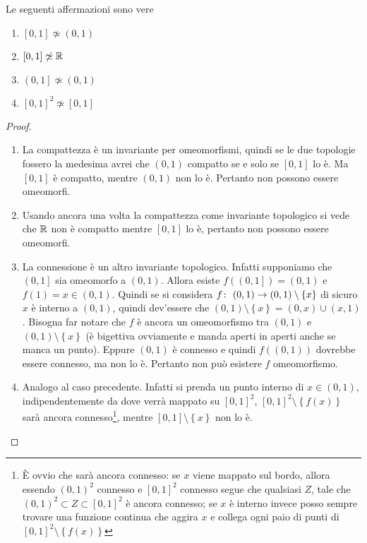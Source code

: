 \begin{theorem}
	Le seguenti affermazioni sono vere
	\begin{enumerate}
		\item $\left[0,1\right] \not\simeq (0,1)$
		\item $\left[0,1\right] \not\simeq \mathbb{R}$
		\item $\left(0,1\right] \not\simeq (0,1)$
		\item $\left[0,1\right]^2 \not\simeq \left[0,1\right]$
	\end{enumerate}
\end{theorem}
\begin{proof}
	\begin{enumerate}
		\item La compattezza è un invariante per omeomorfismi, quindi se le due topologie fossero la medesima avrei che $(0,1)$ compatto se e solo se $\left[0,1\right]$ lo è. Ma $\left[0,1\right]$ è compatto, mentre $(0,1)$ non lo è. Pertanto non possono essere omeomorfi.
		\item Usando ancora una volta la compattezza come invariante topologico si vede che $\mathbb{R}$ non è compatto mentre $\left[0,1\right]$ lo è, pertanto non possono essere omeomorfi.
		\item La connessione è un altro invariante topologico. Infatti supponiamo che $\left(0,1\right]$ sia omeomorfo a $\left(0,1\right)$. Allora esiste $f(\left(0,1\right]) = \left(0,1\right)$ e $f(1) = x \in (0,1)$. Quindi se si considera $f \colon\ (0,1) \rightarrow (0,1)\setminus \left\{x\right\}$ di sicuro $x$ è interno a $(0,1)$, quindi dev'essere che $(0,1) \setminus \left\{x\right\} = (0, x) \cup (x, 1)$. Bisogna far notare che $f$ è ancora un omeomorfismo tra $(0,1)$ e $(0,1)\setminus \left\{x\right\}$ (è bigettiva ovviamente e manda aperti in aperti anche se manca un punto). Eppure $(0,1)$ è connesso e quindi $f((0,1))$ dovrebbe essere connesso, ma non lo è. Pertanto non può esistere $f$ omeomorfismo.
		\item Analogo al caso precedente. Infatti si prenda un punto interno di $x \in (0,1)$, indipendentemente da dove verrà mappato su $\left[0,1\right]^2$, $\left[0,1\right]^2 \setminus \left\{f(x)\right\}$ sarà ancora connesso\footnote{È ovvio che sarà ancora connesso: se $x$ viene mappato sul bordo, allora essendo $(0,1)^2$ connesso e $\left[0,1\right]^2$ connesso segue che qualsiasi $Z$, tale che $(0,1)^2 \subset Z \subset \left[0,1\right]^2$ è ancora connesso; se $x$ è interno invece posso sempre trovare una funzione continua che aggira $x$ e collega ogni paio di punti di $\left[0,1\right]^2 \setminus \left\{f(x)\right\}$}, mentre $\left[0,1\right] \setminus \left\{x\right\}$ non lo è. 
	\end{enumerate}
\end{proof}
